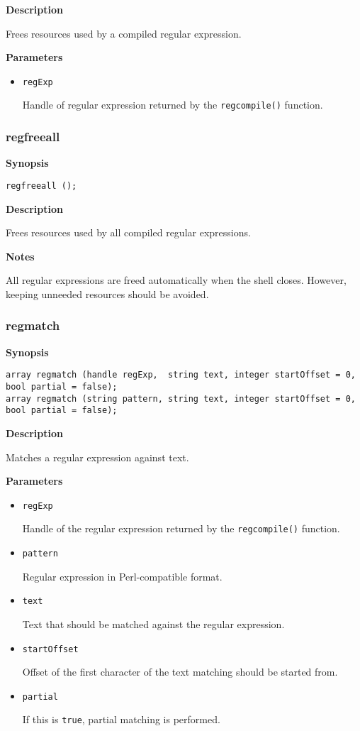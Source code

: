 \documentclass[a4paper, 10pt, titlepage]{article}
\begin{document}
\textbf{Description}

Frees resources used by a compiled regular expression.

\textbf{Parameters}

\begin{itemize}
\item \texttt{regExp}

Handle of regular expression returned by the \texttt{regcompile()} function.
\end{itemize}

\subsubsection{regfreeall}

\textbf{Synopsis}

\begin{verbatim}
regfreeall ();
\end{verbatim}

\textbf{Description}

Frees resources used by all compiled regular expressions.

\textbf{Notes}

All regular expressions are freed automatically when the shell closes. However, keeping unneeded resources should be avoided.

\subsubsection{regmatch}

\textbf{Synopsis}

\begin{verbatim}
array regmatch (handle regExp,  string text, integer startOffset = 0, bool partial = false);
array regmatch (string pattern, string text, integer startOffset = 0, bool partial = false);
\end{verbatim}

\textbf{Description}

Matches a regular expression against text.

\textbf{Parameters}

\begin{itemize}
\item \texttt{regExp}

Handle of the regular expression returned by the \texttt{regcompile()} function.

\item \texttt{pattern}

Regular expression in Perl-compatible format.

\item \texttt{text}

Text that should be matched against the regular expression.

\item \texttt{startOffset}

Offset of the first character of the text matching should be started from.

\item \texttt{partial}

If this is \texttt{true}, partial matching is performed.
\end{itemize}
\end{document}
